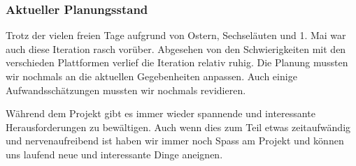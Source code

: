 \subsubsection{Aktueller Planungsstand}
Trotz der vielen freien Tage aufgrund von Ostern, Sechseläuten und 1. Mai war auch diese Iteration rasch vorüber. Abgesehen von den Schwierigkeiten mit den verschieden Plattformen verlief die Iteration relativ ruhig. Die Planung mussten wir nochmals an die aktuellen Gegebenheiten anpassen. Auch einige Aufwandsschätzungen mussten wir nochmals revidieren.

Während dem Projekt gibt es immer wieder spannende und interessante Herausforderungen zu bewältigen. Auch wenn dies zum Teil etwas zeitaufwändig und nervenaufreibend ist haben wir immer noch Spass am Projekt und können uns laufend neue und interessante Dinge aneignen.
